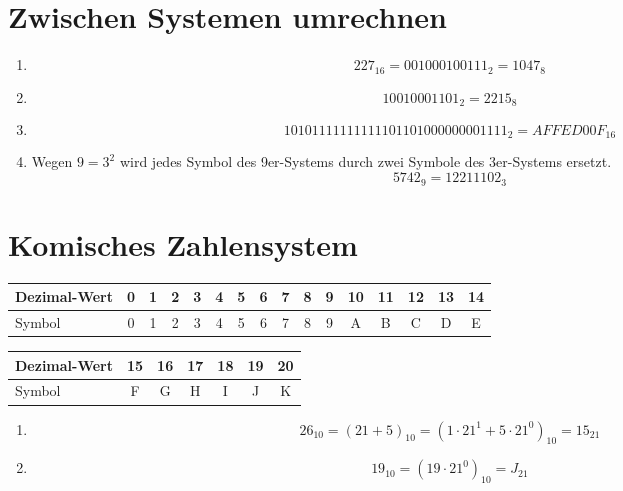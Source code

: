 \documentclass[a4paper]{article}
\begin{document}
\section{Zwischen Systemen umrechnen}
\begin{enumerate}[label=\alph*)]
	\item 
		\begin{equation*}
		227_{16} = 001 000 100 111_{2} = 1047_{8}
		\end{equation*}
	\item 
		\begin{equation*}
		10 010 001 101_{2} = 2215_{8}
		\end{equation*}
	\item 
		\begin{equation*}
		1010 1111 1111 1110 1101 0000 0000 1111_{2} = AFFED00F_{16}
		\end{equation*}
	\item 
		Wegen $9 = 3^2$ wird jedes Symbol des 9er-Systems durch zwei Symbole des 3er-Systems ersetzt. 
		\begin{equation*}
		5742_{9} = 12 21 11 02_{3}
		\end{equation*}
\end{enumerate}

\section{Komisches Zahlensystem}
\begin{table}[h!]
	\begin{tabular}{|l|c|c|c|c|c|c|c|c|c|c|c|c|c|c|c|}
		\hline
			Dezimal-Wert & 0 & 1 & 2 & 3 & 4 & 5 & 6 & 7 & 8 & 9 & 10 & 11 & 12 & 13 & 14 \\		
		\hline
		Symbol & 0 & 1 & 2 & 3 & 4 & 5 & 6 & 7 & 8 & 9 & A & B & C & D & E \\
		\hline
	\end{tabular}

	\begin{tabular}{|l|c|c|c|c|c|c|}
		\hline
		Dezimal-Wert & 15 & 16 & 17 & 18 & 19 & 20 \\	
		\hline
		Symbol & F & G & H & I & J & K \\
		\hline
	\end{tabular}
\end{table}

\begin{enumerate}[label=\alph*)]
	\item
	\begin{equation*}
		26_{10} = (21 + 5)_{10} = (1 \cdot 21^1 + 5 \cdot 21^0)_{10} = 15_{21}
	\end{equation*}
	
	\item 
	\begin{equation*}
		19_{10} = (19 \cdot 21^0)_{10} = J_{21}
	\end{equation*}
\end{enumerate}
\end{document}
